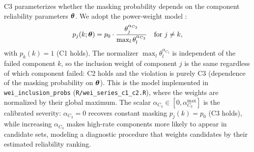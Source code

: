 C3 parameterizes whether the masking probability depends on the component
reliability parameters $\bm{\theta}$. We adopt the power-weight model
\citep{Mukhopadhyay2006}:
\begin{equation}
\label{eq:c3-violation}
    p_j(k; \bm{\theta}) = p_0 \cdot
        \frac{\theta_j^{\alpha_{C_3}}}
             {\max_{l} \theta_l^{\alpha_{C_3}}}
    \quad \text{for } j \neq k,
\end{equation}
with $p_k(k) = 1$ (C1 holds). The normalizer
$\max_l \theta_l^{\alpha_{C_3}}$ is independent of the failed
component $k$, so the inclusion weight of component $j$ is the same
regardless of which component failed: C2 holds and the violation is
purely C3 (dependence of the masking probability on $\bm{\theta}$). This
is the model implemented in \texttt{wei\_inclusion\_probs}
(\texttt{R/wei\_series\_c1\_c2.R}), where the weights are normalized
by their global maximum. The scalar
$\alpha_{C_3} \in [0, \alpha_{C_3}^{\max}]$ is the calibrated severity:
$\alpha_{C_3} = 0$ recovers constant masking $p_j(k) = p_0$ (C3 holds),
while increasing $\alpha_{C_3}$ makes high-rate components more likely to
appear in candidate sets, modeling a diagnostic procedure that weights
candidates by their estimated reliability ranking.

